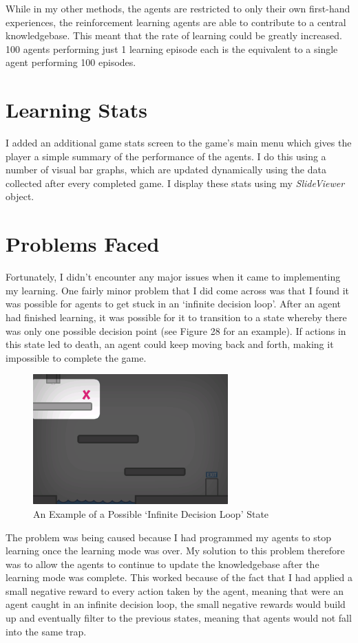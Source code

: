 \documentclass[a4paper,oneside]{report}
\begin{document}
While in my other methods, the agents are restricted to only their own first-hand experiences, the reinforcement learning agents are able to contribute to a central knowledgebase. This meant that the rate of learning could be greatly increased. 100 agents performing just 1 learning episode each is the equivalent to a single agent performing 100 episodes.

\section{Learning Stats}

I added an additional game stats screen to the game's main menu which gives the player a simple summary of the performance of the agents. I do this using a number of visual bar graphs, which are updated dynamically using the data collected after every completed game. I display these stats using my \emph{SlideViewer} object.

\section{Problems Faced}
	
Fortunately, I didn't encounter any major issues when it came to implementing my learning. One fairly minor problem that I did come across was that I found it was possible for agents to get stuck in an `infinite decision loop'. After an agent had finished learning, it was possible for it to transition to a state whereby there was only one possible decision point (see Figure 28 for an example). If actions in this state led to death, an agent could keep moving back and forth, making it impossible to complete the game.

\begin{figure}[h!]
  \centering
    \includegraphics[width=75mm]{sources/images/Screen_InfiniteLoop}
    \caption{An Example of a Possible `Infinite Decision Loop' State}
\end{figure}

The problem was being caused because I had programmed my agents to stop learning once the learning mode was over. My solution to this problem therefore was to allow the agents to continue to update the knowledgebase after the learning mode was complete. This worked because of the fact that I had applied a small negative reward to every action taken by the agent, meaning that were an agent caught in an infinite decision loop, the small negative rewards would build up and eventually filter to the previous states, meaning that agents would not fall into the same trap.
	
\end{document}
